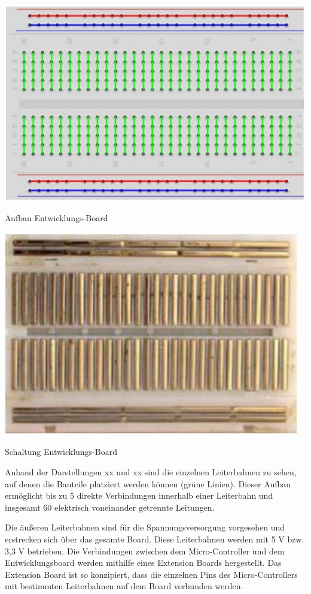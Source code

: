 \documentclass[conference,compsoc,final,a4paper]{IEEEtran}
\begin{document}
\includegraphics{../images/board.png}
\caption{Aufbau Entwicklungs-Board}
\label{Elektrik:DevBoard}
\includegraphics{../images/board2.png}
\caption{Schaltung Entwicklungs-Board}
\label{Elektrik:DevBoardInternal}

Anhand der Darstellungen xx und xx sind die einzelnen Leiterbahnen zu sehen, auf denen die Bauteile platziert werden können (grüne Linien). Dieser Aufbau ermöglicht bis zu 5 direkte Verbindungen innerhalb einer Leiterbahn und insgesamt 60 elektrisch voneinander getrennte Leitungen.

Die äußeren Leiterbahnen sind für die Spannungsversorgung vorgesehen und erstrecken sich über das gesamte Board. Diese Leiterbahnen werden mit 5 V bzw. 3,3 V betrieben.
Die Verbindungen zwischen dem Micro-Controller und dem Entwicklungsboard werden mithilfe eines Extension Boards hergestellt. Das Extension Board ist so konzipiert, dass die einzelnen Pins des Micro-Controllers mit bestimmten Leiterbahnen auf dem Board verbunden werden.
\end{document}
